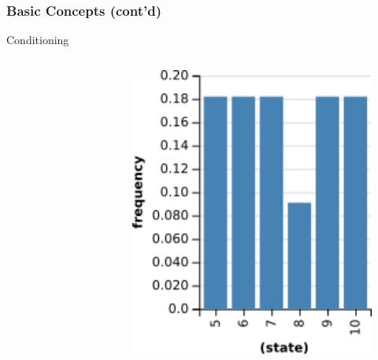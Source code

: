 \documentclass[usenames,dvipsnames]{beamer}
\begin{document}
\begin{frame}[fragile]
  \frametitle{Basic Concepts (cont'd)}
  Conditioning
  \begin{columns}[t]
    \begin{column}{.65\textwidth}
      \inputminted[fontsize=\fontsize{7}{7}\selectfont]{js}{src/roll4.wppl}
    \end{column}
    \begin{column}{.31\textwidth}
      \begin{figure}[ht]
        \centering
        \includegraphics[width=1\textwidth,height=0.6\textheight]{figures/roll4.png}
        \caption*{\label{fig:roll4}}
      \end{figure}
    \end{column}
  \end{columns}
\end{frame}
\end{document}
